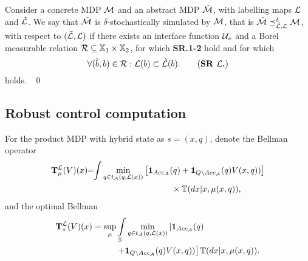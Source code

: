 \documentclass{ifacconf}
\begin{document}
\begin{definition}\label{def:apbsim}
Consider a concrete MDP $\mathcal{M}$ and an abstract  MDP $\tilde{\mathcal{M}}$, with labelling maps $\mathcal{L}$ and  $\tilde{\mathcal{L}}$.   
We say that	$\tilde{\mathcal{M}}$ is $\delta$-stochastically simulated by $\mathcal{M}$, that is $\tilde{\mathcal{M}}\preceq^{\delta}_{\tilde{\mathcal{L}},\mathcal{L}}\mathcal{M}$, with respect to $(\tilde{\mathcal{L}},\mathcal{L})$  if there exists an interface function $\mathcal{U}_{v}$ and
	a Borel measurable relation $\mathcal{R}\subseteq {\mathbb{X}}_1\times {\mathbb{X}}_2$, for which \textbf{SR.1-2} hold and for which 	\begin{equation}
	  \forall (\tilde b,b)\in \rel:  \Labset(b)\subset \tilde{\Labset}(b).
\tag{\textbf{SR~$\CA L$.}}
	\end{equation} 
holds. \hfill\mbox{ }\qed
\end{definition}





\subsection{Robust control computation}

For the product MDP with hybrid state as $s=(x, q)$, denote the Bellman operator
\begin{align}\label{eq:V_recopt_inf}
& \Bel_\mu^\Labset (V)(x) \!\!=\!\!\int%
\min_{\bar q \in t_\FSA(q, \Labset(\bar x))}\left[\mathbf 1_{Acc_\FSA}(\bar q)+  \mathbf 1_{Q\setminus Acc_\FSA}(\bar q)V(\bar x,\bar q))\right]\notag\\&\hspace{5cm}\hfill \times{\mathbb{T}}(d\bar x|x,\mu(x,q)),
\end{align}
and the optimal Bellman 
\begin{align}\label{eq:V_recopt_inf}
& \Bel_\ast^\Labset (V)(x) =\sup_\mu\int_{\S}\min_{\bar q \in t_\FSA(q, \Labset(\bar x))}\left[\mathbf 1_{Acc_\FSA}(\bar q)\right.\hspace{1.5cm}\\&\left.\hspace{2.5cm}+  \mathbf 1_{Q\setminus Acc_\FSA}(\bar q)V(\bar x,\bar q))\right]\notag {\mathbb{T}}(d\bar x|x,\mu(x,q)).
\end{align}
\end{document}
